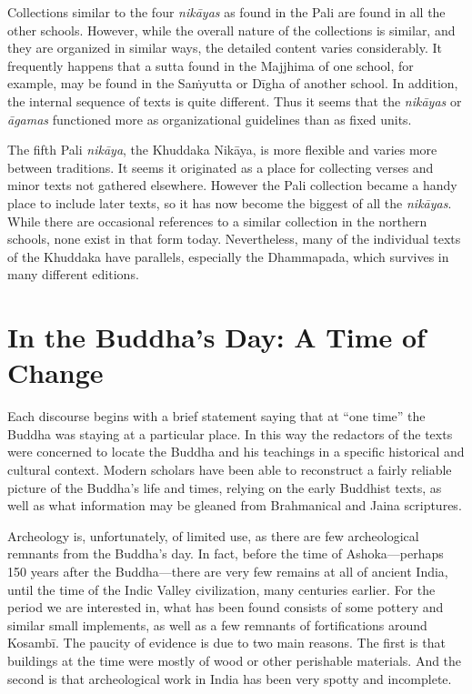 \documentclass[12pt,openany]{book}%
\begin{document}
Collections similar to the four \textit{\textsanskrit{nikāyas}} as found in the Pali are found in all the other schools. However, while the overall nature of the collections is similar, and they are organized in similar ways, the detailed content varies considerably. It frequently happens that a sutta found in the Majjhima of one school, for example, may be found in the \textsanskrit{Saṁyutta} or \textsanskrit{Dīgha} of another school. In addition, the internal sequence of texts is quite different. Thus it seems that the \textit{\textsanskrit{nikāyas}} or \textit{\textsanskrit{āgamas}} functioned more as organizational guidelines than as fixed units.

The fifth Pali \textit{\textsanskrit{nikāya}}, the Khuddaka \textsanskrit{Nikāya}, is more flexible and varies more between traditions. It seems it originated as a place for collecting verses and minor texts not gathered elsewhere. However the Pali collection became a handy place to include later texts, so it has now become the biggest of all the \textit{\textsanskrit{nikāyas}}. While there are occasional references to a similar collection in the northern schools, none exist in that form today. Nevertheless, many of the individual texts of the Khuddaka have parallels, especially the Dhammapada, which survives in many different editions.

\section*{In the Buddha’s Day: A Time of Change}

Each discourse begins with a brief statement saying that at “one time” the Buddha was staying at a particular place. In this way the redactors of the texts were concerned to locate the Buddha and his teachings in a specific historical and cultural context. Modern scholars have been able to reconstruct a fairly reliable picture of the Buddha’s life and times, relying on the early Buddhist texts, as well as what information may be gleaned from Brahmanical and Jaina scriptures.

Archeology is, unfortunately, of limited use, as there are few archeological remnants from the Buddha’s day. In fact, before the time of Ashoka—perhaps 150 years after the Buddha—there are very few remains at all of ancient India, until the time of the Indic Valley civilization, many centuries earlier. For the period we are interested in, what has been found consists of some pottery and similar small implements, as well as a few remnants of fortifications around \textsanskrit{Kosambī}. The paucity of evidence is due to two main reasons. The first is that buildings at the time were mostly of wood or other perishable materials. And the second is that archeological work in India has been very spotty and incomplete.
\end{document}
